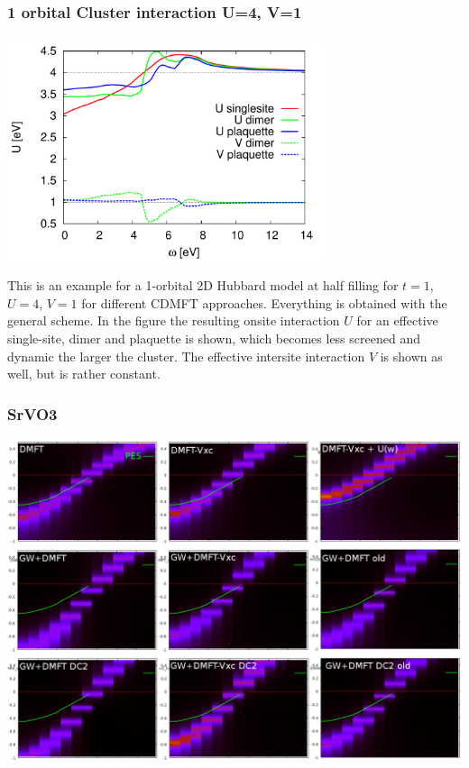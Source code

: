 \documentclass[12pt,a4paper]{scrartcl}
\numberwithin{equation}{section}
\begin{document}
\subsubsection{1 orbital Cluster interaction U=4, V=1}
\includegraphics[width=0.7\textwidth]{figs/bathNonlocFromDMFTderiv/cluster_ueff.pdf}

This is an example for a 1-orbital 2D Hubbard model at half filling for $t=1$, $U=4$, $V=1$ for different CDMFT approaches.
Everything is obtained with the general scheme.
In the figure the resulting onsite interaction $U$ for an effective single-site, dimer and plaquette is shown,
which becomes less screened and dynamic the larger the cluster.
The effective intersite interaction $V$ is shown as well, but is rather constant.

\subsubsection{SrVO3}
\includegraphics[width=1\textwidth]{figs/bathNonlocFromDMFTderiv/srvo3_comp.png}
\end{document}

